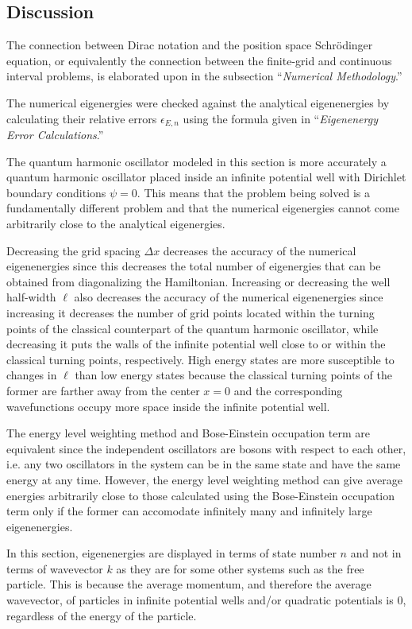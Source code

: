 \subsection{Discussion}

The connection between Dirac notation and the position space Schrödinger equation, or equivalently the connection between the finite-grid and continuous interval problems, is elaborated upon in the subsection ``\textit{Numerical Methodology}.''

\vspace{3mm}
The numerical eigenergies were checked against the analytical eigenenergies by calculating their relative errors $\epsilon_{E,n}$ using the formula given in ``\textit{Eigenenergy Error Calculations}.''

\vspace{3mm}
The quantum harmonic oscillator modeled in this section is more accurately a quantum harmonic oscillator placed inside an infinite potential well with Dirichlet boundary conditions $\psi=0$. This means that the problem being solved is a fundamentally different problem and that the numerical eigenergies cannot come arbitrarily close to the analytical eigenergies.

\vspace{3mm}
Decreasing the grid spacing $\Delta x$ decreases the accuracy of the numerical eigenenergies since this decreases the total number of eigenergies that can be obtained from diagonalizing the Hamiltonian. Increasing or decreasing the well half-width $\ell$ also decreases the accuracy of the numerical eigenenergies since increasing it decreases the number of grid points located within the turning points of the classical counterpart of the quantum harmonic oscillator, while decreasing it puts the walls of the infinite potential well close to or within the classical turning points, respectively. High energy states are more susceptible to changes in $\ell$ than low energy states because the classical turning points of the former are farther away from the center $x=0$ and the corresponding wavefunctions occupy more space inside the infinite potential well.

\vspace{3mm}
The energy level weighting method and Bose-Einstein occupation term are equivalent since the independent oscillators are bosons with respect to each other, i.e. any two oscillators in the system can be in the same state and have the same energy at any time. However, the energy level weighting method can give average energies arbitrarily close to those calculated using the Bose-Einstein occupation term only if the former can accomodate infinitely many and infinitely large eigenenergies.

\vspace{3mm}
In this section, eigenenergies are displayed in terms of state number $n$ and not in terms of wavevector $k$ as they are for some other systems such as the free particle. This is because the average momentum, and therefore the average wavevector, of particles in infinite potential wells and/or quadratic potentials is 0, regardless of the energy of the particle.